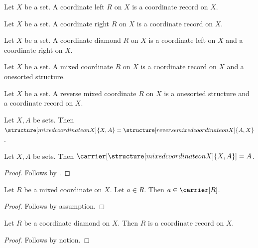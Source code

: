 

\begin{struct}\label{coordinate_left}
    Let $X$ be a set.
    A coordinate left $R$ on $X$ is a coordinate record on $X$.
\end{struct}

\begin{struct}\label{coordinate_right}
    Let $X$ be a set.
    A coordinate right $R$ on $X$ is a coordinate record on $X$.
\end{struct}

\begin{struct}\label{coordinate_diamond}
    Let $X$ be a set.
    A coordinate diamond $R$ on $X$ is a coordinate left on $X$ and a coordinate right on $X$.
\end{struct}

\begin{struct}\label{mixed_coordinate}
    Let $X$ be a set.
    A mixed coordinate $R$ on $X$ is a coordinate record on $X$ and a onesorted structure.
\end{struct}

\begin{struct}\label{reverse_mixed_coordinate}
    Let $X$ be a set.
    A reverse mixed coordinate $R$ on $X$ is a onesorted structure and a coordinate record on $X$.
\end{struct}

\begin{proposition}\label{mixed_field_order}
    Let $X,A$ be sets.
    Then $\structure[mixed coordinate on X]{X,A}=\structure[reverse mixed coordinate on X]{A,X}$.
\end{proposition}

\begin{proposition}\label{mixed_carrier_projection}
    Let $X,A$ be sets.
    Then $\carrier[\structure[mixed coordinate on X]{X,A}]=A$.
\end{proposition}
\begin{proof}
    Follows by .
\end{proof}

\begin{proposition}\label{mixed_carrier_membership}
    Let $R$ be a mixed coordinate on $X$.
    Let $a\in R$.
    Then $a\in\carrier[R]$.
\end{proposition}
\begin{proof}
    Follows by assumption.
\end{proof}

\begin{proposition}\label{coordinate_diamond_inheritance}
    Let $R$ be a coordinate diamond on $X$.
    Then $R$ is a coordinate record on $X$.
\end{proposition}
\begin{proof}
    Follows by notion.
\end{proof}
